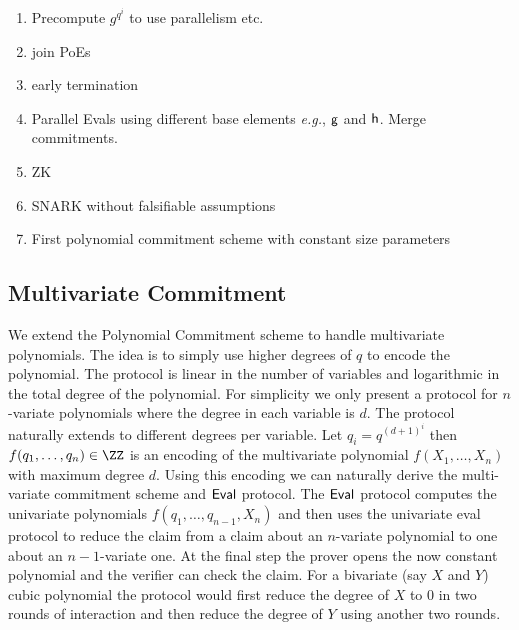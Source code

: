 \documentclass{article}
\theoremstyle{definition}
\begin{document}
\begin{enumerate}
	\item Precompute $g^{q^i}$ to use parallelism etc.
	\item join PoEs
	\item early termination
	\item Parallel Evals using different base elements \emph{e.g.}, $\mathsf{g}$ and $\mathsf{h}$. Merge commitments.
	\item ZK
	\item SNARK without falsifiable assumptions
	\item First polynomial commitment scheme with constant size parameters
\end{enumerate}

\subsection{Multivariate Commitment}\label{section:multivariate}
  We extend the Polynomial Commitment scheme to handle multivariate polynomials. The idea is to simply use higher degrees of $q$ to encode the polynomial. The protocol is linear in the number of variables and logarithmic in the total degree of the polynomial. For simplicity we only present a protocol for $n$-variate polynomials where the degree in each variable is $d$. The protocol naturally extends to different degrees per variable.
Let $q_i=q^{(d+1)^i}$ then $f(q_1,\dots,q_n)\in \ZZ$ is an encoding of the multivariate polynomial $f(X_1,\dots,X_n)$ with maximum degree $d$. Using this encoding we can naturally derive the multi-variate commitment scheme and $\textsf{{Eval}}$ protocol. The $\textsf{{Eval}}$ protocol  computes the univariate polynomials $f(q_1,\dots,q_{n-1},X_n)$ and then uses the univariate eval protocol to reduce the claim from a claim about an $n$-variate polynomial to one about an $n-1$-variate one. At the final step the prover opens the now constant polynomial and the verifier can check the claim. For a bivariate (say $X$ and $Y$) cubic polynomial the protocol would first reduce the degree of $X$ to $0$ in two rounds of interaction and then reduce the degree of $Y$ using another two rounds.
 
\end{document}

